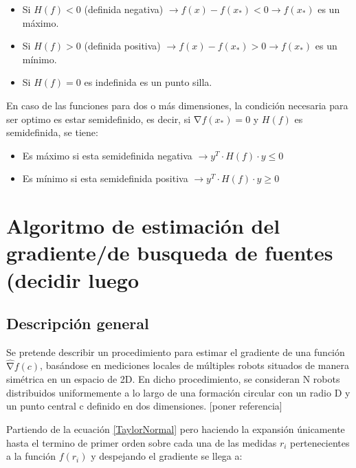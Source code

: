 \begin{itemize}
	\item Si ${H}\left(f\right)<0$ (definida negativa) $\rightarrow{f}\left(x\right)-f\left(x_{*}\right)<0\rightarrow{f}\left(x_{*}\right)$ es un máximo.
	\item Si ${H}\left(f\right)>0$ (definida positiva) $\rightarrow{f}\left(x\right)-f\left(x_{*}\right)>0\rightarrow{f}\left(x_{*}\right)$ es un mínimo.
	\item Si ${H}\left(f\right)=0$ es indefinida es un punto silla.
\end{itemize}

En caso de las funciones para dos o más dimensiones, la condición necesaria para ser optimo es estar semidefinido, es decir, si $\mathrm{\nabla}{f}{\left(x_{*}\right)}=0$ y ${H}\left(f\right)$ es semidefinida, se tiene:

\begin{itemize}
	\item Es máximo si esta semidefinida negativa $\rightarrow{y}^{T}\cdot{H}\left({f}\right)\cdot{y}\leq{0}$
	\item Es mínimo si esta semidefinida positiva $\rightarrow{y}^{T}\cdot{H}\left({f}\right)\cdot{y}\geq{0}$
\end{itemize}

\section{Algoritmo de estimación del gradiente/de busqueda de fuentes (decidir luego}


\subsection{Descripción general}

Se pretende describir un procedimiento para estimar el gradiente de una función $\widehat{\mathrm{\nabla }}{f}\left(c\right)$, basándose en mediciones locales de múltiples robots situados de manera simétrica en un espacio de 2D. En dicho procedimiento, se consideran N robots distribuidos uniformemente a lo largo de una formación circular con un radio D y un punto central c definido en dos dimensiones. [poner referencia]

Partiendo de la ecuación \ref{TaylorNormal} pero haciendo la expansión únicamente hasta el termino de primer orden sobre cada una de las medidas $r_i$ pertenecientes a la función ${f}\left({r}_{i}\right)$ y despejando el gradiente se llega a:

